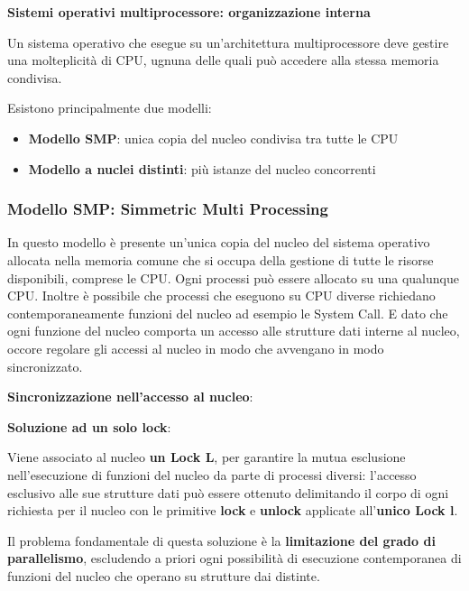 \documentclass{article}
\begin{document}
\vspace{3mm}
\textbf{Sistemi operativi multiprocessore: organizzazione interna}
\vspace{3mm}

Un sistema operativo che esegue su un'architettura multiprocessore deve gestire una molteplicità di CPU, ugnuna delle quali può accedere alla stessa memoria
condivisa.

Esistono principalmente due modelli:
\begin{itemize}
    \item \textbf{Modello SMP}: unica copia del nucleo condivisa tra tutte le CPU
    \item \textbf{Modello a nuclei distinti}: più istanze del nucleo concorrenti
\end{itemize}

\subsubsection{Modello SMP: Simmetric Multi Processing}

In questo modello è presente un'unica copia del nucleo del sistema operativo allocata nella memoria comune che si occupa della gestione di tutte le risorse
disponibili, comprese le CPU. Ogni processi può essere allocato su una qualunque CPU. Inoltre è possibile che processi che eseguono su CPU diverse
richiedano contemporaneamente funzioni del nucleo ad esempio le System Call. E dato che ogni funzione del nucleo comporta un accesso alle strutture
dati interne al nucleo, occore regolare gli accessi al nucleo in modo che avvengano in modo sincronizzato.

\vspace{3mm}
\textbf{Sincronizzazione nell'accesso al nucleo}:

\vspace{3mm}
\textbf{Soluzione ad un solo lock}:

Viene associato al nucleo \textbf{un Lock L}, per garantire la mutua esclusione nell'esecuzione di funzioni del nucleo da parte di processi diversi: l'accesso
esclusivo alle sue strutture dati può essere ottenuto delimitando il corpo di ogni richiesta per il nucleo con le primitive \textbf{lock} e \textbf{unlock}
applicate all'\textbf{unico Lock l}.

Il problema fondamentale di questa soluzione è la \textbf{limitazione del grado di parallelismo}, escludendo a priori ogni possibilità di esecuzione
contemporanea di funzioni del nucleo che operano su strutture dai distinte.
\end{document}
